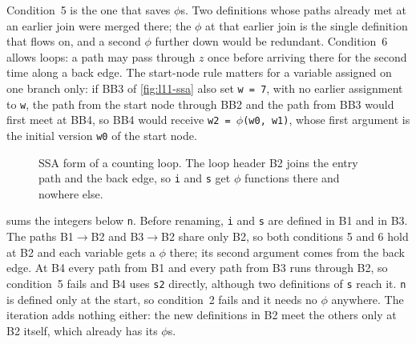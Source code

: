 \documentclass[../main.tex]{subfiles}
\begin{document}
%
Condition~5 is the one that saves $\phi$s.  Two definitions whose paths
already met at an earlier join were merged there; the $\phi$ at that
earlier join is the single definition that flows on, and a second
$\phi$ further down would be redundant.  Condition~6 allows loops: a
path may pass through $z$ once before arriving there for the second
time along a back edge.  The start-node rule matters for a variable
assigned on one branch only: if BB3 of \cref{fig:l11-ssa} also set
\texttt{w = 7}, with no earlier assignment to \texttt{w}, the path
from the start node through BB2 and the path from BB3 would first meet
at BB4, so BB4 would receive \texttt{w2 = $\phi$(w0, w1)}, whose first
argument is the initial version \texttt{w0} of the start node.

\begin{figure}[tb]
  \centering
  
  \caption{SSA form of a counting loop.  The loop header B2 joins the
    entry path and the back edge, so \texttt{i} and \texttt{s} get
    $\phi$ functions there and nowhere else.}
  \label{fig:l11-path-convergence}
\end{figure}

\begin{example}
  \label{ex:l11-path-convergence}
   sums the integers below \texttt{n}.
  Before renaming, \texttt{i} and \texttt{s} are defined in B1 and in B3.
  The paths B1$\to$B2 and B3$\to$B2 share only B2, so both conditions
  5 and 6 hold at B2 and each variable gets a $\phi$ there; its second
  argument comes from the back edge.  At B4 every path from B1 and
  every path from B3 runs through B2, so condition~5 fails and B4 uses
  \texttt{s2} directly, although two definitions of \texttt{s} reach
  it.  \texttt{n} is defined only at the start, so condition~2 fails
  and it needs no $\phi$ anywhere.  The iteration adds nothing either:
  the new definitions in B2 meet the others only at B2 itself, which
  already has its $\phi$s.
\end{example}
\end{document}
